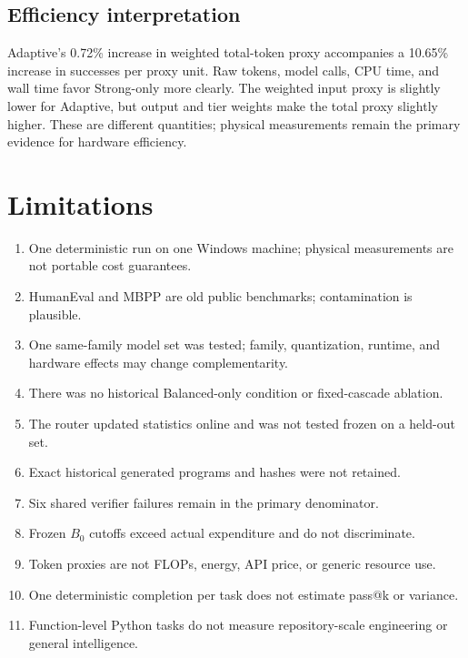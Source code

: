 \documentclass[10pt]{article}
\begin{document}
\subsection{Efficiency interpretation}
Adaptive's 0.72\% increase in weighted total-token proxy accompanies a 10.65\%
increase in successes per proxy unit. Raw tokens, model calls, CPU time, and
wall time favor Strong-only more clearly. The weighted input proxy is slightly
lower for Adaptive, but output and tier weights make the total proxy slightly
higher. These are different quantities; physical measurements remain the
primary evidence for hardware efficiency.

\section{Limitations}
\begin{table}[t]
\centering
\scriptsize
\caption{Threats to validity and treatment.}
\label{tab:threats}

\end{table}
\begin{enumerate}
\item One deterministic run on one Windows machine; physical measurements are
not portable cost guarantees.
\item HumanEval and MBPP are old public benchmarks; contamination is plausible.
\item One same-family model set was tested; family, quantization, runtime, and
hardware effects may change complementarity.
\item There was no historical Balanced-only condition or fixed-cascade ablation.
\item The router updated statistics online and was not tested frozen on a
held-out set.
\item Exact historical generated programs and hashes were not retained.
\item Six shared verifier failures remain in the primary denominator.
\item Frozen $B_0$ cutoffs exceed actual expenditure and do not discriminate.
\item Token proxies are not FLOPs, energy, API price, or generic resource use.
\item One deterministic completion per task does not estimate pass@k or variance.
\item Function-level Python tasks do not measure repository-scale engineering
or general intelligence.
\end{enumerate}
\end{document}
